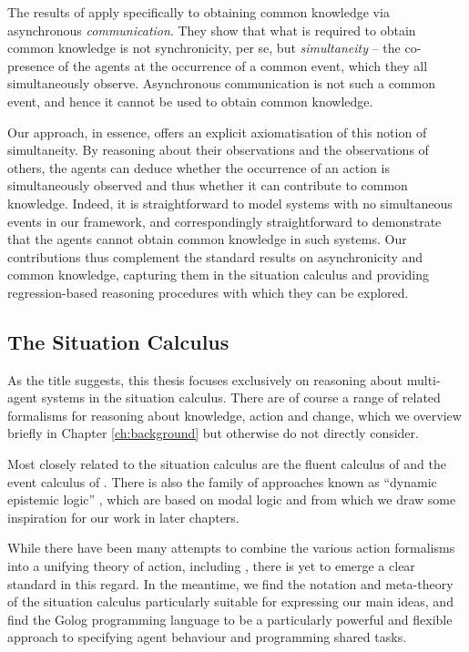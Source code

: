 The results of \citep{halpern90knowledge_distrib} apply specifically
to obtaining common knowledge via asynchronous \emph{communication}.
They show that what is required to obtain common knowledge is not
synchronicity, per se, but \emph{simultaneity} -- the co-presence
of the agents at the occurrence of a common event, which they all
simultaneously observe. Asynchronous communication is not such a common
event, and hence it cannot be used to obtain common knowledge.

Our approach, in essence, offers an explicit axiomatisation of this
notion of simultaneity. By reasoning about their observations and
the observations of others, the agents can deduce whether the occurrence
of an action is simultaneously observed and thus whether it can contribute
to common knowledge. Indeed, it is straightforward to model systems
with no simultaneous events in our framework, and correspondingly
straightforward to demonstrate that the agents cannot obtain common
knowledge in such systems. Our contributions thus complement the standard
results on asynchronicity and common knowledge, capturing them in
the situation calculus and providing regression-based reasoning procedures
with which they can be explored.


\subsection{The Situation Calculus}

As the title suggests, this thesis focuses exclusively on reasoning
about multi-agent systems in the situation calculus. There are of
course a range of related formalisms for reasoning about knowledge,
action and change, which we overview briefly in Chapter \ref{ch:background}
but otherwise do not directly consider.

Most closely related to the situation calculus are the fluent calculus
of \citet{thielscher98fluent_calculus} and the event calculus of
\citet{kowalski86event_calculus}. There is also the family of approaches
known as {}``dynamic epistemic logic'' \citep{baltag98pa_ck,vanBenthem06lcc,vanBentham06tree_of_knowledge},
which are based on modal logic and from which we draw some inspiration
for our work in later chapters.

While there have been many attempts to combine the various action
formalisms into a unifying theory of action, including \citep{belleghem95combine_sitcalc_evtcalc,kowalski97reconcile_sitcalc_evtcalc,thielscher06reconcile_sc_fc,thielscher07unifying_action_calculus},
there is yet to emerge a clear standard in this regard. In the meantime,
we find the notation and meta-theory of the situation calculus particularly
suitable for expressing our main ideas, and find the Golog programming
language to be a particularly powerful and flexible approach to specifying
agent behaviour and programming shared tasks.

